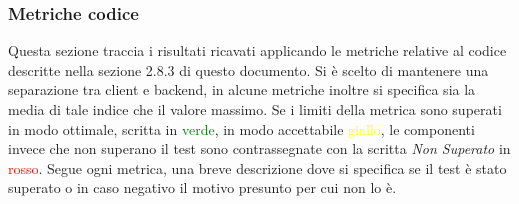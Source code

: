 		\subsubsection{Metriche codice}
			Questa sezione traccia i risultati ricavati applicando le metriche relative al codice descritte nella sezione 2.8.3 di questo documento. Si è scelto di mantenere una separazione tra client e backend, in alcune metriche inoltre si specifica sia la media di tale indice che il valore massimo. Se i limiti della metrica sono superati in modo ottimale, scritta in \textcolor{green}{verde}, in modo accettabile \textcolor{yellow}{giallo}, le componenti invece che non superano il test sono contrassegnate con la scritta \textit{Non Superato} in \textcolor{red}{rosso}. Segue ogni metrica, una breve descrizione dove si specifica se il test è stato superato o in caso negativo il motivo presunto per cui non lo è.\\
